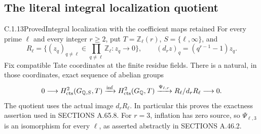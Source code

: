 \subsection{The literal integral localization quotient}
\label{sec:ghost-strict-localization}

\begin{result}{C.1.13}{Proved}{Integral localization with the coefficient maps retained}
\label{thm:ghost-strict-localization}
For every prime \(\ell\) and every integer \(r\ge2\), put
\(T=\mathbb Z_\ell(r)\), \(S=\{\ell,\infty\}\), and
\[
 R_\ell=\{(z_q)_{q\ne\ell}\in\prod_{q\ne\ell}\mathbb Z_\ell:
                 z_q\longrightarrow0\},\qquad
 (d_rz)_q=(q^{r-1}-1)z_q.
\]
Fix compatible Tate coordinates at the finite residue fields.
There is a natural, in those coordinates, exact sequence of
abelian groups
\[
 0\longrightarrow H^2_{\rm cts}(G_{\mathbb Q,S},T)
 \xrightarrow{\rm inf}H^2_{\rm cts}(G_{\mathbb Q},T)
 \xrightarrow{\Psi_{\ell,r}}R_\ell/d_rR_\ell
 \longrightarrow0.
\]
The quotient uses the actual image \(d_rR_\ell\).
In particular this proves the exactness assertion used in
SECTIONS A.65.8. For \(r=3\), inflation has zero source,
so \(\Psi_{\ell,3}\) is an isomorphism for every \(\ell\),
as asserted abstractly in SECTIONS A.46.2.
\end{result}
